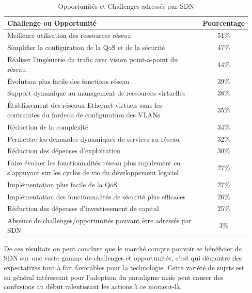 \begin{table}[!h]
\centering
\begin{tabular}{|p{12cm}|c|}
\hline 
\bf Challenge ou Opportunité & \bf Pourcentage \\ 
\hline 
Meilleure utilisation des ressources réseau & 51\% \\ 
\hline 
Simplifier la configuration de la QoS et de la sécurité  & 47\%  \\
\hline 
Réaliser l'ingénierie du trafic avec vision point-à-point du réseau & 44\% \\ 
\hline 
Évolution plus facile des fonctions réseau & 39\% \\ 
\hline 
Support dynamique au management de ressources virtuelles  & 38\% \\ 
\hline 
Établissement des réseaux Ethernet virtuels sans les contraintes du fardeau de configuration des VLANs & 35\% \\ 
\hline 
Réduction de la complexité & 34\% \\ 
\hline 
Permettre les demandes dynamiques de services au réseau & 32\% \\ 
\hline 
Réduction des dépenses d'exploitation & 30\% \\ 
\hline 
Faire évoluer les fonctionnalités réseau plus rapidement en s'appuyant sur les cycles de vie du développement logiciel & 27\% \\ 
\hline 
Implémentation plus facile de la QoS & 27\% \\ 
\hline 
Implémentation des fonctionnalités de sécurité plus efficaces & 26\% \\ 
\hline 
Réduction des dépenses d'investissement de capital & 25\% \\ 
\hline 
Absence de challenges/opportunités pouvant être adressés par SDN & 3\% \\ 
\hline 
\end{tabular}
\caption{Opportunités et Challenges adressés par SDN \cite{2013GuideSDNNVTable11}}
\end{table} 

\clearpage

De ces résultats on peut conclure que le marché compte pouvoir se bénéficier de SDN sur une vaste gamme de challenges et opportunités, c'est qui démontre des expectatives tout à fait favorables pour la technologie. Cette variété de sujets est en général intéressant pour l'adoption du \gls{paradigme} mais peut causer des confusions au début ralentissant les actions à ce moment-là.

